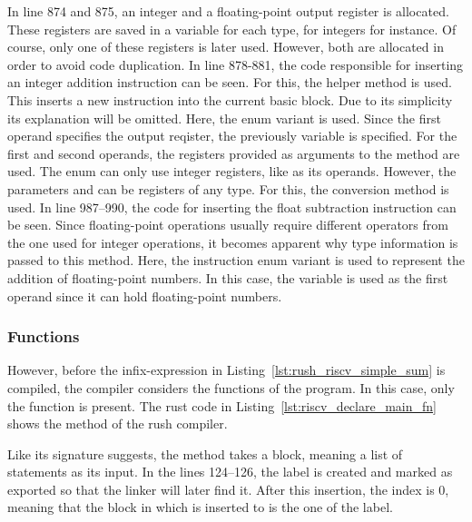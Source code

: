 In line 874 and 875, an integer and a floating-point output register is allocated.
These registers are saved in a variable for each type,  for integers for instance.
Of course, only one of these registers is later used.
However, both are allocated in order to avoid code duplication.
In line 878-881, the code responsible for inserting an integer addition instruction can be seen.
For this, the  helper method is used.
This inserts a new instruction into the current basic block.
Due to its simplicity its explanation will be omitted.
Here, the  enum variant is used.
Since the first operand specifies the output reqister, the previously  variable is specified.
For the first and second operands, the registers provided as arguments to the  method are used.
The  enum can only use integer registers, like  as its operands.
However, the parameters  and  can be registers of any type.
For this, the conversion method  is used.
In line 987--990, the code for inserting the float subtraction instruction can be seen.
Since floating-point operations usually require different operators from the one used for integer operations,
it becomes apparent why type information is passed to this method.
Here, the  instruction enum variant is used to represent the addition of floating-point numbers.
In this case, the variable  is used as the first operand since it can hold floating-point numbers.

\subsubsection{Functions}

However, before the infix-expression in Listing~\ref{lst:rush_riscv_simple_sum} is compiled,
the compiler considers the functions of the program.
In this case, only the  function is present.
The rust code in Listing~\ref{lst:riscv_declare_main_fn} shows the  method of the rush \riscv{} compiler.


Like its signature suggests, the method takes a block, meaning a list of statements as its input.
In the lines 124--126, the  label is created and marked as exported so that the linker will later find it.
After this insertion, the  index is 0, meaning that the block in which is inserted to is the one of the  label.

